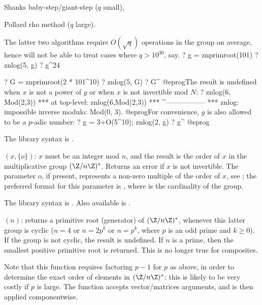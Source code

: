 \item Shanks baby-step/giant-step ($q$ small),

\item Pollard rho method ($q$ large).

The latter two algorithms require $O(\sqrt{q})$ operations in the group on
average, hence will not be able to treat cases where $q > 10^{30}$, say.
\bprog
? g = znprimroot(101)
? znlog(5, g)
? g^24

? G = znprimroot(2 * 101^10)
? znlog(5, G)
? G^%
@eprog\noindent The result is undefined when $x$ is not a power of $g$ or
when $x$ is not invertible mod $N$:
\bprog
? znlog(6, Mod(2,3))
  ***   at top-level: znlog(6,Mod(2,3))
  ***                 ^-----------------
  *** znlog: impossible inverse modulo: Mod(0, 3).
@eprog\noindent For convenience, $g$ is also allowed to be a $p$-adic number:
\bprog
? g = 3+O(5^10); znlog(2, g)
? g^%
@eprog

The library syntax is .

$(x,\{o\})$: \label{se:znorder}$x$ must be an integer mod $n$, and the
result is the order of $x$ in the multiplicative group $(\Z/n\Z)^*$. Returns
an error if $x$ is not invertible.
The parameter o, if present, represents a non-zero
multiple of the order of $x$, see ; the preferred format for
this parameter is , where 
is the cardinality of the group.

The library syntax is .
Also available is .

$(n)$: \label{se:znprimroot}returns a primitive root (generator) of $(\Z/n\Z)^*$, whenever this
latter group is cyclic ($n = 4$ or $n = 2p^k$ or $n = p^k$, where $p$ is an
odd prime and $k \geq 0$). If the group is not cyclic, the result is
undefined. If $n$ is a prime, then the smallest positive primitive root is
returned. This is no longer true for composites.

Note that this function requires factoring $p-1$ for $p$ as above,
in order to determine the exact order of elements in
$(\Z/n\Z)^*$: this is likely to be very costly if $p$ is large.
The function accepts vector/matrices arguments, and is then applied
componentwise.

